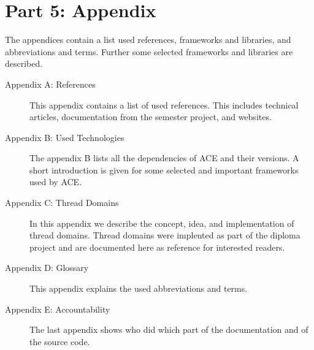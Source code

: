  
\section{Part 5: Appendix}
The appendices contain a list used references, frameworks and libraries, 
and abbreviations and terms. Further some selected frameworks and libraries
are described.

\begin{description}
 \item[Appendix A: References] This appendix contains a list of used references. This includes technical articles, documentation from the semester project, and websites.
 \item[Appendix B: Used Technologies] The appendix B lists all the dependencies of ACE and their versions. A short introduction is given for some selected and important frameworks used by ACE.
 \item[Appendix C: Thread Domains] In this appendix we describe the concept, idea, and implementation of thread domains. Thread domains were implented as part of the diploma project and are documented here as reference for interested readers.
 \item[Appendix D: Glossary] This appendix explains the used abbreviations and terms.
 \item[Appendix E: Accountability] The last appendix shows who did which part of the documentation and of the source code.
\end{description}
